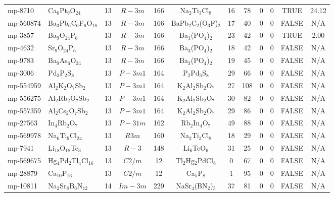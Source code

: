 {\begin{longtable}{llcccccccccc}
    mp-8710 & Ca$_{6}$Pt$_{9}$O$_{24}$ & 13    & $R-3m$ & 166   & Na$_{2}$Ti$_{3}$Cl$_{8}$ & 16    & 78    & 0     & 0     & TRUE  & 24.12  \\
    mp-560874 & Ba$_{3}$Pb$_{6}$C$_{6}$F$_{6}$O$_{18}$ & 13    & $R-3m$ & 166   & BaPb$_{2}$C$_{2}$(O$_{3}$F)$_{2}$ & 17    & 40    & 0     & 0     & FALSE & N/A \\
    mp-3857 & Ba$_{9}$O$_{24}$P$_{6}$ & 13    & $R-3m$ & 166   & Ba$_{3}$(PO$_{4}$)$_{2}$ & 23    & 42    & 0     & 0     & TRUE  & 2.00  \\
    mp-4632 & Sr$_{9}$O$_{24}$P$_{6}$ & 13    & $R-3m$ & 166   & Ba$_{3}$(PO$_{4}$)$_{2}$ & 18    & 42    & 0     & 0     & FALSE & N/A \\
    mp-9783 & Ba$_{9}$As$_{6}$O$_{24}$ & 13    & $R-3m$ & 166   & Ba$_{3}$(PO$_{4}$)$_{2}$ & 19    & 45    & 0     & 0     & FALSE & N/A \\
    mp-3006 & Pd$_{3}$P$_{2}$S$_{8}$ & 13    & $P-3m1$ & 164   & P$_{2}$Pd$_{3}$S$_{8}$ & 29    & 66    & 0     & 0     & FALSE & N/A \\
    mp-554959 & Al$_{2}$K$_{2}$O$_{7}$Sb$_{2}$ & 13    & $P-3m1$ & 164   & K$_{2}$Al$_{2}$Sb$_{2}$O$_{7}$ & 27    & 108   & 0     & 0     & FALSE & N/A \\
    mp-556275 & Al$_{2}$Rb$_{2}$O$_{7}$Sb$_{2}$ & 13    & $P-3m1$ & 164   & K$_{2}$Al$_{2}$Sb$_{2}$O$_{7}$ & 30    & 82    & 0     & 0     & FALSE & N/A \\
    mp-557359 & Al$_{2}$Cs$_{2}$O$_{7}$Sb$_{2}$ & 13    & $P-3m1$ & 164   & K$_{2}$Al$_{2}$Sb$_{2}$O$_{7}$ & 29    & 86    & 0     & 0     & FALSE & N/A \\
    mp-27563 & In$_{4}$Rb$_{2}$O$_{7}$ & 13    & $P-31m$ & 162   & Rb$_{2}$In$_{4}$O$_{7}$ & 49    & 88    & 0     & 0     & FALSE & N/A \\
    mp-569978 & Na$_{6}$Ti$_{9}$Cl$_{24}$ & 13    & $R3m$ & 160   & Na$_{2}$Ti$_{3}$Cl$_{8}$ & 18    & 29    & 0     & 0     & FALSE & N/A \\
    mp-7941 & Li$_{18}$O$_{18}$Te$_{3}$ & 13    & $R-3$ & 148   & Li$_{6}$TeO$_{6}$ & 31    & 25    & 0     & 0     & FALSE & N/A \\
    mp-569675 & Hg$_{4}$Pd$_{2}$Tl$_{4}$Cl$_{16}$ & 13    & $C2/m$ & 12    & Tl$_{2}$Hg$_{2}$PdCl$_{8}$ & 0     & 67    & 0     & 0     & FALSE & N/A \\
    mp-28879 & Ca$_{10}$P$_{16}$ & 13    & $C2/m$ & 12    & Ca$_{5}$P$_{8}$ & 1     & 95    & 0     & 0     & FALSE & N/A \\
    mp-10811 & Na$_{2}$Sr$_{8}$B$_{6}$N$_{12}$ & 14    & $Im-3m$ & 229   & NaSr$_{4}$(BN$_{2}$)$_{3}$ & 37    & 81    & 0     & 0     & FALSE & N/A \\

\end{longtable}}
